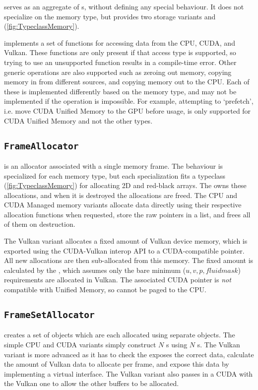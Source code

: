  serves as an aggregate of s, without defining any special behaviour.
It does not specialize on the memory type, but provides two storage variants  and  (\cref{fig:TypeclassMemory}).

 implements a set of functions for accessing data from the CPU, CUDA, and Vulkan.
These functions are only present if that access type is supported, so trying to use an unsupported function results in a compile-time error.
Other generic operations are also supported such as zeroing out memory, copying memory in from different sources, and copying memory out to the CPU.
Each of these is implemented differently based on the memory type, and may not be implemented if the operation is impossible.
For example, attempting to `prefetch', i.e. move CUDA Unified Memory to the GPU before usage, is only supported for CUDA Unified Memory and not the other types.

\subsection{\texttt{FrameAllocator}}
 is an allocator associated with a single memory frame.
The behaviour is specialized for each memory type, but each specialization fits a typeclass (\cref{fig:TypeclassMemory}) for allocating 2D and red-black arrays.
The  owns these allocations, and when it is destroyed the allocations are freed.
The CPU and CUDA Managed memory variants allocate data directly using their respective allocation functions when requested, store the raw pointers in a list, and frees all of them on destruction.

The Vulkan variant allocates a fixed amount of Vulkan device memory, which is exported using the CUDA-Vulkan interop API to a CUDA-compatible pointer.
All new allocations are then sub-allocated from this memory.
The fixed amount is calculated by the , which assumes only the bare minimum ($u, v, p, fluidmask$) requirements are allocated in Vulkan.
The associated CUDA pointer is \emph{not} compatible with Unified Memory, so cannot be paged to the CPU.

\subsection{\texttt{FrameSetAllocator}}
 creates a set of  objects which are each allocated using separate  objects.
The simple CPU and CUDA variants simply construct $N$ s using $N$ s.
The Vulkan variant is more advanced as it has to check the  exposes the correct data, calculate the amount of Vulkan data to allocate per frame, and expose this data by implementing a virtual  interface.
The Vulkan variant also passes in a CUDA  with the Vulkan one to allow the other buffers to be allocated.


